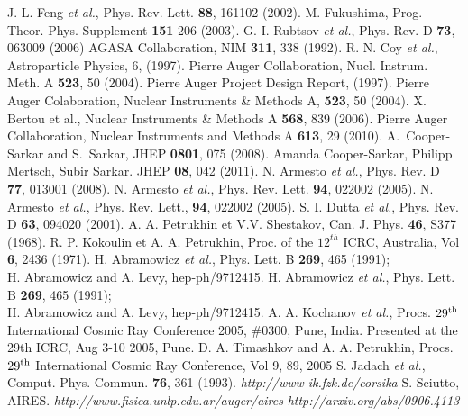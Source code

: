 \begin{thebibliography}{1}
 J. L. Feng {\it et al.}, Phys. Rev. Lett. \textbf{88}, 161102 (2002).
 M. Fukushima, Prog. Theor. Phys. Supplement \textbf{151} 206 (2003). 
 G. I. Rubtsov {\it et al.}, Phys. Rev. D \textbf{73}, 063009 (2006)
 AGASA Collaboration, NIM \textbf{311}, 338 (1992).
 R. N. Coy {\it et al.}, Astroparticle Physics, 6, (1997).
 Pierre Auger Collaboration, Nucl. Instrum. Meth. A \textbf{523}, 50 (2004).
 Pierre Auger Project Design Report, (1997).
 Pierre Auger Colaboration, Nuclear Instruments \& Methods A, \textbf{523}, 50 (2004).
  X. Bertou et al., Nuclear Instruments \& Methods A \textbf{568}, 839 (2006).
 Pierre Auger Collaboration, Nuclear Instruments and Methods A \textbf{613}, 29 (2010).
 A.~Cooper-Sarkar and S.~Sarkar, JHEP {\bf 0801}, 075 (2008).
Amanda Cooper-Sarkar, Philipp Mertsch, Subir Sarkar. JHEP \textbf{08}, 042 (2011).
 N. Armesto {\it et al.}, Phys. Rev. D \textbf{77}, 013001 (2008).
 N. Armesto {\it et al.}, Phys. Rev. Lett. \textbf{94}, 022002 (2005).
 N. Armesto {\it et al.}, Phys. Rev. Lett., \textbf{94}, 022002 (2005).
 S. I. Dutta {\it et al.}, Phys. Rev. D \textbf{63}, 094020 (2001).
 A. A. Petrukhin et V.V. Shestakov, Can. J. Phys. \textbf{46}, S377 (1968).
 R. P. Kokoulin et A. A. Petrukhin, Proc. of the $12^{th}$ ICRC, Australia, Vol \textbf{6}, 2436 (1971).
 H. Abramowicz {\it et al.}, Phys. Lett. B \textbf{269}, 465  (1991);\\ H. Abramowicz and A. Levy, hep-ph/9712415.
 H. Abramowicz {\it et al.}, Phys. Lett. B \textbf{269}, 465  (1991);\\ H. Abramowicz and A. Levy, hep-ph/9712415.
A. A. Kochanov {\it et al.}, Procs. $29^{\rm th}$ International Cosmic Ray Conference 2005, $\#$0300, Pune, India. Presented at the 29th ICRC, Aug 3-10 2005, Pune.
 D. A. Timashkov and A. A. Petrukhin, Procs. $29^{\rm th}$ International Cosmic Ray Conference, Vol 9, 89, 2005
 S. Jadach {\it et al.}, Comput. Phys. Commun. {\bf 76}, 361 (1993).
 \emph{http://www-ik.fzk.de/corsika}
 S. Sciutto, AIRES. \emph{http://www.fisica.unlp.edu.ar/auger/aires}
 \emph{http://arxiv.org/abs/0906.4113}

\end{thebibliography}
